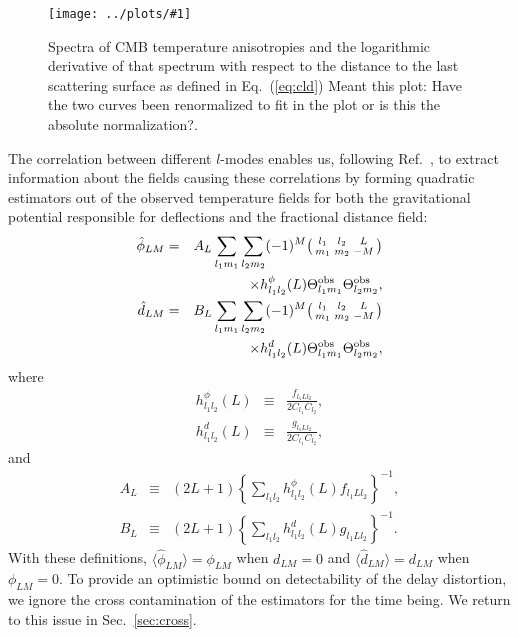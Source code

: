 \documentclass[prd,amsmath,amssymb,floatfix,superscriptaddress,nofootinbib,twocolumn]{revtex4-1}
\def\bea{\begin{eqnarray}}
\def\eea{\end{eqnarray}}
\newcommand{\ec}[1]{Eq.~(\ref{eq:#1})}
\newcommand{\eql}[1]{\label{eq:#1}}
\newcommand{\sfig}[2]{
\texttt{[image: ../plots/\#1]}
        }
\newcommand{\Sfig}[2]{
   \begin{figure}[thbp]
   \begin{center}
    \sfig{#1.pdf}{\columnwidth}
    \caption{{\small #2}}
    \label{fig:#1}
     \end{center}
   \end{figure}
}
\newcommand{\wh}[1]{{\color{red} #1}}
\begin{document}
\Sfig{TT1}{Spectra of CMB temperature anisotropies and the logarithmic derivative of that spectrum with respect to the distance to the last scattering surface as defined in \ec{cld}
\wh{Meant this plot: Have the two curves been renormalized to fit in the plot or is this the absolute
normalization?}.}



The correlation between different $l$-modes enables us, following Ref.~\cite{Okamoto:2003zw}, to extract information about the fields causing these correlations by forming quadratic estimators out of the observed temperature fields for both the gravitational potential responsible for deflections and the fractional distance field:
\bea
\hat \phi_{LM} &=& A_L 
\sum_{l_1m_1}\sum_{l_2m_2} 
 (-1)^M  \bigl(\begin{smallmatrix} l_1 & l_2 & L \\ m_1 & m_2 & -M  \end{smallmatrix}\bigr) 
 \nonumber \\  && \times 
 h^{\phi}_{l_1l_2}(L)  \tob_{l_1m_1} \tob_{l_2m_2}, \nonumber \\
\hat d_{LM} &=& B_{L} \sum_{l_1m_1}\sum_{l_2m_2}
(-1)^M  \bigl(\begin{smallmatrix} l_1 & l_2 & L \\ m_1 & m_2 & -M  \end{smallmatrix}\bigr) 
\nonumber \\ && \times
h^{d}_{l_1l_2}(L)  \tob_{l_1m_1} \tob_{l_2m_2}, \eql{distest}
\eea
where
\bea
h^{\phi}_{l_1l_2}(L)&\equiv& \frac{f_{l_1Ll_2}}{2C_{l_1}C_{l_2}} ,\nonumber\\
h^{d}_{l_1l_2}(L)&\equiv& \frac{g_{l_1Ll_2}}{2C_{l_1}C_{l_2}},\eql{defh}
\eea
and
\bea
A_L &\equiv& 
(2L+1)
 \left\{ \sum_{l_1l_2} h^{\phi}_{l_1l_2}(L)f_{l_1Ll_2}\right\}^{-1},\nonumber\\
B_L &\equiv& (2L+1) \left\{ \sum_{l_1l_2} h^{d}_{l_1l_2}(L)g_{l_1Ll_2}\right\}^{-1}.\eql{bt}
\eea 
With these definitions, 
$\langle \hat\phi_{LM} \rangle = \phi_{LM}$ when $d_{LM}=0$ and
$\langle \hat d _{LM} \rangle = d_{LM}$ when $\phi_{LM}=0$.  To provide an optimistic bound
on detectability of the delay distortion, we ignore the cross contamination of the estimators for the time being. We return to this  issue in Sec.~\ref{sec:cross}.


\end{document}

